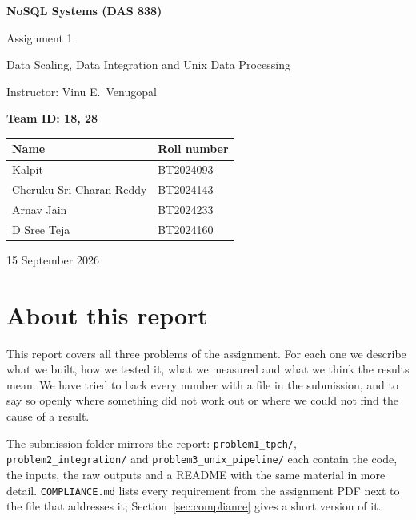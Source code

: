 \documentclass[11pt,a4paper]{article}
\newcommand{\file}[1]{\texttt{#1}}
\begin{document}
\begin{titlepage}
\centering
\vspace*{3cm}
{\LARGE\bfseries NoSQL Systems (DAS 838)\par}
\vspace{0.6cm}
{\Large Assignment 1\par}
\vspace{0.3cm}
{\large Data Scaling, Data Integration and Unix Data Processing\par}
\vspace{0.8cm}
{\large Instructor: Vinu E.\ Venugopal\par}
\vspace{2cm}
{\large\bfseries Team ID: 18, 28\par}
\vspace{0.6cm}
\begin{tabular}{ll}
\toprule
\textbf{Name} & \textbf{Roll number} \\
\midrule
Kalpit & BT2024093 \\
Cheruku Sri Charan Reddy & BT2024143 \\
Arnav Jain & BT2024233 \\
D Sree Teja & BT2024160 \\
\bottomrule
\end{tabular}
\vfill
{\large 15 September 2026\par}
\end{titlepage}

\tableofcontents
\newpage

\section*{About this report}

This report covers all three problems of the assignment. For each one we
describe what we built, how we tested it, what we measured and what we think
the results mean. We have tried to back every number with a file in the
submission, and to say so openly where something did not work out or where
we could not find the cause of a result.

The submission folder mirrors the report: \file{problem1\_tpch/},
\file{problem2\_integration/} and \file{problem3\_unix\_pipeline/} each contain
the code, the inputs, the raw outputs and a README with the same material in
more detail. \file{COMPLIANCE.md} lists every requirement from the assignment
PDF next to the file that addresses it; Section~\ref{sec:compliance} gives a
short version of it.
\end{document}
